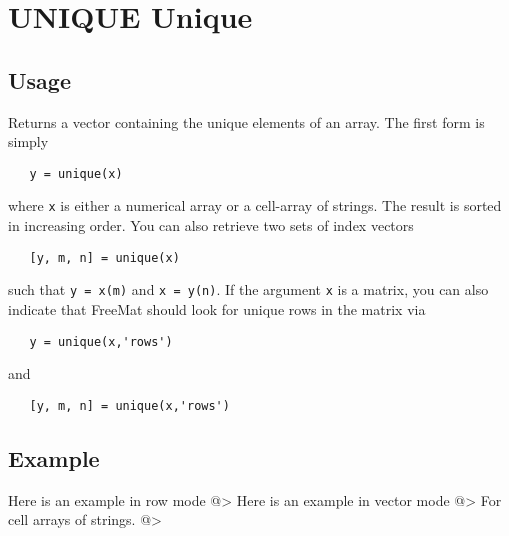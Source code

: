 \section{UNIQUE Unique}

\subsection{Usage}

Returns a vector containing the unique elements of an array.  The first
form is simply
\begin{verbatim}
   y = unique(x)
\end{verbatim}
where \verb|x| is either a numerical array or a cell-array of strings.  The 
result is sorted in increasing order.  You can also retrieve two sets
of index vectors
\begin{verbatim}
   [y, m, n] = unique(x)
\end{verbatim}
such that \verb|y = x(m)| and \verb|x = y(n)|.  If the argument \verb|x| is a matrix,
you can also indicate that FreeMat should look for unique rows in the
matrix via
\begin{verbatim}
   y = unique(x,'rows')
\end{verbatim}
and
\begin{verbatim}
   [y, m, n] = unique(x,'rows')
\end{verbatim}
\subsection{Example}

Here is an example in row mode
@>
Here is an example in vector mode
@>
For cell arrays of strings.
@>
